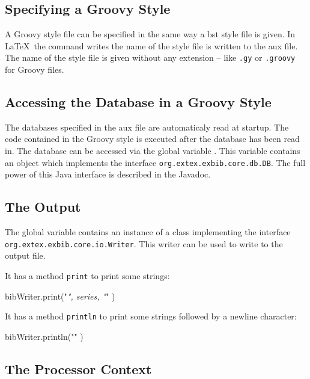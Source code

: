 \subsection{Specifying a Groovy Style}

A Groovy style file can be specified in the same way a bst style file
is given. In \LaTeX\ the command  writes the
name of the style file is written to the aux file. The name of the
style file is given without any extension -- like \verb|.gy| or
\verb|.groovy| for Groovy files.


\subsection{Accessing the Database in a Groovy Style}

The databases specified in the aux file are automaticaly read at
startup. The code contained in the Groovy style is executed after the
database has been read in. The database can be accessed via the global
variable . This variable contains an object which
implements the interface \texttt{org.extex.exbib.core.db.DB}. The full
power of this Java interface is described in the Javadoc.


\subsection{The Output}

The global variable  contains an instance of a class
implementing the interface \texttt{org.extex.exbib.core.io.Writer}.
This writer can be used to write to the output file.

It has a method \texttt{print} to print some strings:

\begin{listings}[language=Java]
  bibWriter.print("{\em ", series, "\/}" )
\end{listings}

It has a method \texttt{println} to print some strings followed by a
newline character:

\begin{listings}[language=Java]
  bibWriter.println("\newcommand{\etalchar}[1]{$^{#1}$}" )
\end{listings}


\subsection{The Processor Context}

